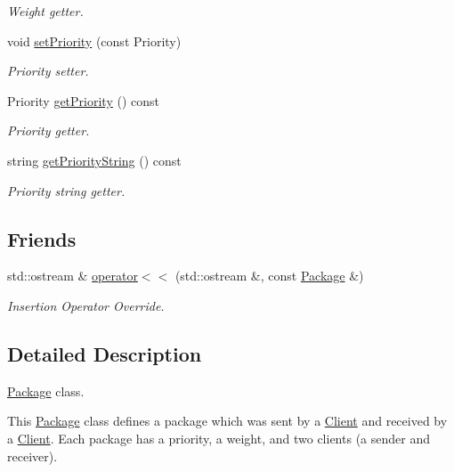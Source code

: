 \begin{DoxyCompactItemize}
\begin{DoxyCompactList}\small\item\em Weight getter. \end{DoxyCompactList}\item 
void \hyperlink{classPackage_afe16b4fbff0a050019ddf47978001464}{set\+Priority} (const Priority)
\begin{DoxyCompactList}\small\item\em Priority setter. \end{DoxyCompactList}\item 
Priority \hyperlink{classPackage_accf52df9d08053e7c1c126d747e6beb0}{get\+Priority} () const 
\begin{DoxyCompactList}\small\item\em Priority getter. \end{DoxyCompactList}\item 
string \hyperlink{classPackage_aaf5a625d7851e24dd18bae23309c03d7}{get\+Priority\+String} () const 
\begin{DoxyCompactList}\small\item\em Priority string getter. \end{DoxyCompactList}\end{DoxyCompactItemize}
\subsection*{Friends}
\begin{DoxyCompactItemize}
\item 
std\+::ostream \& \hyperlink{classPackage_a597c8930017d318dc99060084653366d}{operator$<$$<$} (std\+::ostream \&, const \hyperlink{classPackage}{Package} \&)\hypertarget{classPackage_a597c8930017d318dc99060084653366d}{}\label{classPackage_a597c8930017d318dc99060084653366d}

\begin{DoxyCompactList}\small\item\em Insertion Operator Override. \end{DoxyCompactList}\end{DoxyCompactItemize}


\subsection{Detailed Description}
\hyperlink{classPackage}{Package} class. 

This \hyperlink{classPackage}{Package} class defines a package which was sent by a \hyperlink{classClient}{Client} and received by a \hyperlink{classClient}{Client}. Each package has a priority, a weight, and two clients (a sender and receiver). 

